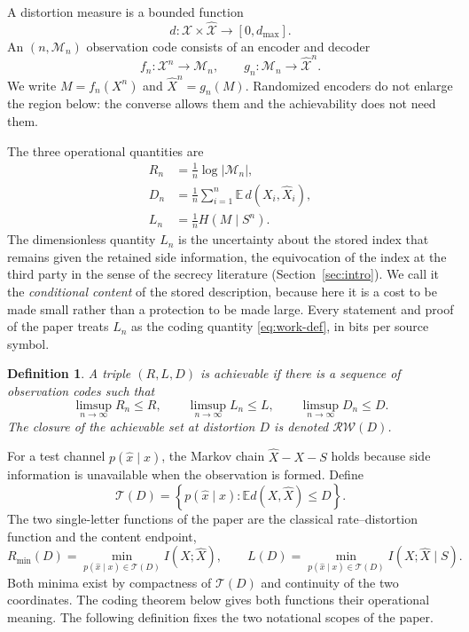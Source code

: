 \documentclass[11pt,onecolumn]{IEEEtran}
\newtheorem{definition}[theorem]{Definition}
\newcommand{\E}{\mathbb{E}}
\newcommand{\cX}{\mathcal{X}}
\newcommand{\hX}{\widehat{X}}
\newcommand{\hXn}{\widehat{X}^{n}}
\newcommand{\RW}{\mathcal{R}\!\mathcal{W}}
\begin{document}
A distortion measure is a bounded function
\begin{equation}
 d:\cX\times\widehat{\cX}\longrightarrow[0,d_{\max}].
\end{equation}
An $(n,\mathcal M_n)$ observation code consists of an encoder and decoder
\begin{equation}
 f_n:\cX^n\to\mathcal M_n,
 \qquad
 g_n:\mathcal M_n\to\widehat{\cX}^{n}.
\end{equation}
We write $M=f_n(X^n)$ and $\hXn=g_n(M)$. Randomized encoders do not enlarge
the region below: the converse allows them and the achievability does not
need them.

The three operational quantities are
\begin{align}
 R_n&=\frac{1}{n}\log |\mathcal M_n|,\label{eq:rate-def}\\
 D_n&=\frac{1}{n}\sum_{i=1}^{n}\E\,d(X_i,\hX_i),\label{eq:dist-def}\\
 L_n&=\frac{1}{n}H(M\mid S^n).\label{eq:work-def}
\end{align}
The dimensionless quantity $L_n$ is the uncertainty about the stored
index that remains given the retained side information, the equivocation
of the index at the third party in the sense of the secrecy literature
(Section~\ref{sec:intro}). We call it the \emph{conditional content} of the
stored description, because here it is a cost to be made small rather
than a protection to be made large. Every statement and proof of the
paper treats $L_n$ as the coding quantity \eqref{eq:work-def}, in bits per
source symbol.

\begin{definition}\label{def:achievability}
A triple $(R,L,D)$ is achievable if there is a sequence of observation codes
such that
\begin{equation}
 \limsup_{n\to\infty}R_n\le R,\qquad
 \limsup_{n\to\infty}L_n\le L,\qquad
 \limsup_{n\to\infty}D_n\le D.
\end{equation}
The closure of the achievable set at distortion $D$ is denoted $\RW(D)$.
\end{definition}

For a test channel $p(\hat x\mid x)$, the Markov chain $\hX-X-S$ holds
because side information is unavailable when the observation is formed.
Define
\begin{equation}
 \mathcal T(D)
 =\left\{p(\hat x\mid x):\E d(X,\hX)\le D\right\}.
\end{equation}
The two single-letter functions of the paper are the classical
rate--distortion function and the content endpoint,
\begin{equation}
 R_{\min}(D)=\min_{p(\hat x\mid x)\in\mathcal T(D)}I(X;\hX),
 \qquad
 L(D)=\min_{p(\hat x\mid x)\in\mathcal T(D)}I(X;\hX\mid S).
 \label{eq:work-endpoint}
\end{equation}
Both minima exist by compactness of $\mathcal T(D)$ and continuity of the
two coordinates. The coding theorem below gives both functions their
operational meaning. The following definition fixes the two notational
scopes of the paper.
\end{document}
